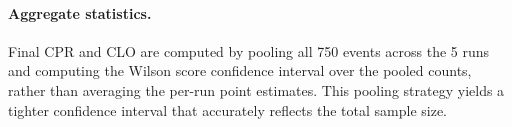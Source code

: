 \paragraph{Aggregate statistics.}
Final CPR and CLO are computed by pooling all 750 events across the 5 runs and computing the Wilson score confidence interval over the pooled counts, rather than averaging the per-run point estimates. This pooling strategy yields a tighter confidence interval that accurately reflects the total sample size.
